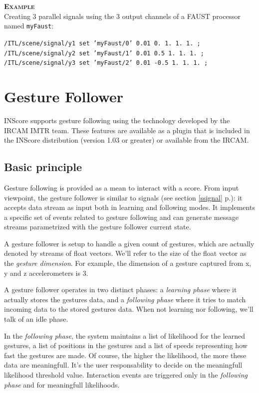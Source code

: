 \documentclass[a4paper,twoside]{report}
\newcommand{\sublevel}[1]	{\section{#1}}
\newcommand{\subsublevel}[1]	{\subsection{#1}}
\newcommand{\fullref}[1]	{\ref{#1} p.\pageref{#1}}
\newcommand{\OSC}[1]		{\texttt{#1}}
\newcommand{\example}		{\textbf{\hspace{-1.5cm}\textbf{\textsc{Example }}}}
\newcommand{\sample}	[1]			{\vspace{-2mm}\begin{center}\colorbox{mygrey}{
								\begin{minipage}[t]{0.9\columnwidth} 
								{\small \texttt{#1}}
								\end{minipage}}\end{center}}
\begin{document}
\example \\
Creating 3 parallel signals using the 3 output channels of a FAUST processor named \OSC{myFaust}:
\sample{/ITL/scene/signal/y1 set 'myFaust/0' 0.01 0. 1. 1. 1. ;\\
/ITL/scene/signal/y2 set 'myFaust/1' 0.01 0.5 1. 1. 1. ;\\
/ITL/scene/signal/y3 set 'myFaust/2' 0.01 -0.5 1. 1. 1. ;
}


\sublevel{Gesture Follower}
\label{GF}

INScore supports gesture following using the technology developed by the IRCAM IMTR team. These features are available as a plugin that is included in the INScore distribution (version 1.03 or greater) or available from the IRCAM.

\subsublevel{Basic principle}\label{gfbasic}
Gesture following is provided as a mean to interact with a score. From input viewpoint, the gesture follower is similar to signals (see section \fullref{ssignal}): it accepts data stream as input both in learning and following modes. It implements a specific set of events related to gesture following and can generate message streams parametrized with the gesture follower current state.

A gesture follower is setup to handle a given count of gestures, which are actually denoted by streams of float vectors. We'll refer to the size of the float vector as the \emph{gesture dimension}. For example, the dimension of a gesture captured from x, y and z accelerometers is 3.

A gesture follower operates in two distinct phases: a \emph{learning phase} where it actually stores the gestures data, and a \emph{following phase} where it tries to match incoming data to the stored gestures data. When not learning nor following, we'll talk of an idle phase. 

In the \emph{following phase}, the system maintains a list of likelihood for the learned gestures, a list of positions in the gestures and a list of speeds representing how fast the gestures are made. Of course, the higher the likelihood, the more these data are meaningfull. It's the user responsability to decide on the meaningfull likelihood threshold value. Interaction events are triggered only in the \emph{following phase} and for meaningfull likelihoods.
\end{document}
